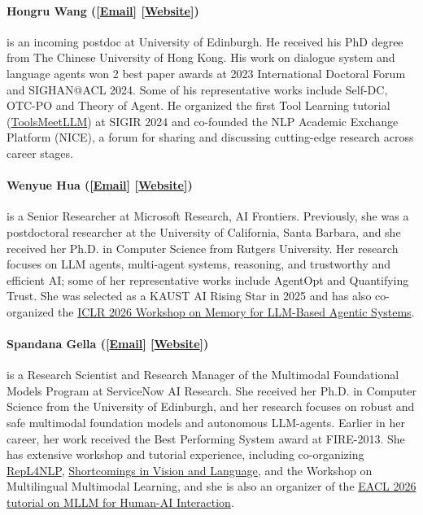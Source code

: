 \paragraph{Hongru Wang ([\href{mailto:hrwise98@gmail.com}{Email}] [\href{https://hrwise-nlp.github.io/}{Website}])}
is an incoming postdoc at University of Edinburgh. He received his PhD degree from The Chinese University of Hong Kong. His work on dialogue system and language agents won 2 best paper awards at 2023 International Doctoral Forum and SIGHAN@ACL 2024. Some of his representative works include Self-DC, OTC-PO and Theory of Agent. He organized the first Tool Learning tutorial (\href{https://hrwise-nlp.github.io/assets/websites/tools-meet-llm/}{ToolsMeetLLM}) at SIGIR 2024 and co-founded the NLP Academic Exchange Platform (NICE), a forum for sharing and discussing cutting-edge research across career stages.

\paragraph{Wenyue Hua ([\href{mailto:wenyuehua@microsoft.com}{Email}] [\href{https://wenyueh.github.io/en/}{Website}])}
is a Senior Researcher at Microsoft Research, AI Frontiers. Previously, she was a postdoctoral researcher at the University of California, Santa Barbara, and she received her Ph.D. in Computer Science from Rutgers University. Her research focuses on LLM agents, multi-agent systems, reasoning, and trustworthy and efficient AI; some of her representative works include AgentOpt and Quantifying Trust. She was selected as a KAUST AI Rising Star in 2025 and has also co-organized the \href{https://iclr.cc/virtual/2026/workshop/10000792}{ICLR 2026 Workshop on Memory for LLM-Based Agentic Systems}.

\paragraph{Spandana Gella ([\href{mailto:spandana.gella@servicenow.com}{Email}] [\href{https://www.servicenow.com/research/author/spandana-gella.html}{Website}])}
is a Research Scientist and Research Manager of the Multimodal Foundational Models Program at ServiceNow AI Research. She received her Ph.D. in Computer Science from the University of Edinburgh, and her research focuses on robust and safe multimodal foundation models and autonomous LLM-agents. Earlier in her career, her work received the Best Performing System award at FIRE-2013. She has extensive workshop and tutorial experience, including co-organizing \href{https://sites.google.com/view/repl4nlp2022/home}{RepL4NLP}, \href{https://sites.google.com/view/sivl2019/home}{Shortcomings in Vision and Language}, and the Workshop on Multilingual Multimodal Learning, and she is also an organizer of the \href{https://mllm4haii.github.io/}{EACL 2026 tutorial on MLLM for Human-AI Interaction}.

